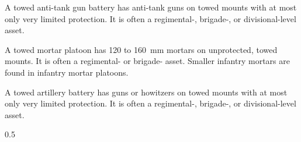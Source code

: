 A towed anti-tank gun battery has anti-tank guns on towed mounts with at most only very limited protection.
It is often a regimental-, brigade-, or divisional-level asset.


A towed mortar platoon has 120 to 160~mm mortars on unprotected, towed mounts.
It is often a regimental- or brigade- asset.
Smaller infantry mortars are found in infantry mortar platoons.


A towed artillery battery has guns or howitzers on towed mounts with at most only very limited protection.
It is often a regimental-, brigade-, or divisional-level asset.

\begin{table}[p]
    \caption*{\hypertarget{table:ground-combat-units}{Ground-Combat and Transport Unit Table}}
    \centering
    \footnotesize
    
    \par
    \begin{tablenote}{0.5\linewidth}
    \end{tablenote}
\end{table}

\begin{table}[p]
    \caption*{\hypertarget{table:vehicle-types}{Vehicle Types Table}}
    \centering
    \scriptsize
    
\end{table}
